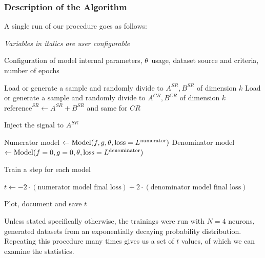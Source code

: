 \documentclass[../../ddppaper2.tex]{subfiles}
\begin{document}
\subsubsection{Description of the Algorithm}
A single run of our procedure goes as follows:

\begin{algorithm}
\caption{Single $t$ value stochastic calculation}
\label{alg:single_train_algorithm}
\begin{algorithmic}[1]

\Statex \textit{Variables in italics are user configurable}
\Statex %

\Require Configuration of model internal parameters, ${\theta}$ usage, dataset source and criteria, number of epochs

\State Load or generate a sample and randomly divide to $A^{SR}, B^{SR}$ of dimension $\mathit{k}$
\State Load or generate a sample and randomly divide to $A^{CR}, B^{CR}$ of dimension $\mathit{k}$
\State $\text{reference}^{SR} \gets A^{SR} + B^{SR}$ and same for $CR$

    \State Inject the signal to $A^{SR}$
\EndIf

\State Numerator model $\gets \text{Model}(f, g, {\theta}, \text{loss} = L^{\text{numerator}})$
\State Denominator model $\gets \text{Model}(f = 0, g = 0, {\theta}, \text{loss} = L^{\text{denominator}})$

    \State Train a step for each model
\EndFor

\State $t \gets -2 \cdot (\text{numerator model final loss}) + 2 \cdot (\text{denominator model final loss})$

\State Plot, document and save
\State \Return $t$

\end{algorithmic}
\end{algorithm}

Unless stated specifically otherwise, the trainings were run with $N=4$ neurons, generated datasets from an exponentially decaying probability distribution.
Repeating this procedure many times gives us a set of $t$ values, of which we can examine the statistics.
\end{document}
